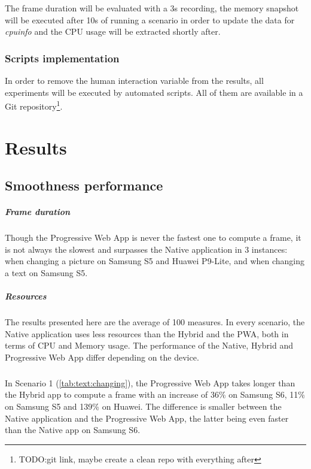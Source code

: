 The frame duration will be evaluated with a 3s recording, the memory snapshot will be executed after 10s of running a scenario in order to update the data for \textit{cpuinfo} and the CPU usage will be extracted shortly after.

\subsection{Scripts implementation}
In order to remove the human interaction variable from the results, all experiments will be executed by automated scripts. All of them are available in a Git repository\footnote{TODO:git link, maybe create a clean repo with everything after}.

\chapter{Results}
\section{Smoothness performance}
\paragraph{Frame duration}
Though the Progressive Web App is never the fastest one to compute a frame, it is not always the slowest and surpasses the Native application in 3 instances: when changing a picture on Samsung S5 and Huawei P9-Lite, and when changing a text on Samsung S5.

\paragraph{Resources}

The results presented here are the average of 100 measures. In every scenario, the Native application uses less resources than the Hybrid and the PWA, both in terms of CPU and Memory usage. The performance of the Native, Hybrid and Progressive Web App differ depending on the device. \paragraph{}
In Scenario 1 (\autoref{tab:text:changing}), the Progressive Web App takes longer than the Hybrid app to compute a frame with an increase of 36\% on Samsung S6, 11\% on Samsung S5 and 139\% on Huawei. The difference is smaller between the Native application and the Progressive Web App, the latter being even faster than the Native app on Samsung S6.

